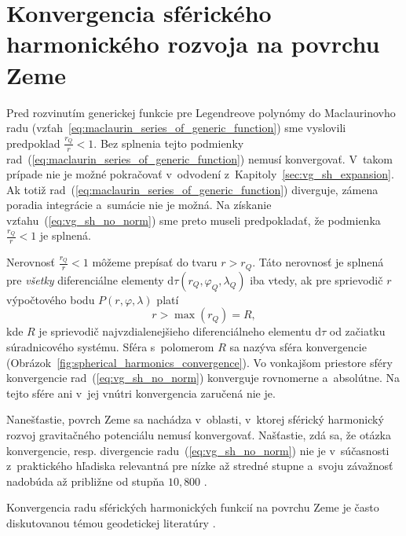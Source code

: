 \documentclass[a4paper,12pt]{book}
\newcommand{\diff}{\mathrm d}
\begin{document}

\section{Konvergencia sférického harmonického rozvoja na povrchu Zeme}
\label{sec:convergence_of_spherical_harmonics}

Pred rozvinutím generickej funkcie pre Legendreove polynómy do Maclaurinovho 
radu (vzťah~\ref{eq:maclaurin_series_of_generic_function}) sme vyslovili 
predpoklad $\frac{r_Q}{r} < 1$.  Bez splnenia tejto podmienky 
rad~(\ref{eq:maclaurin_series_of_generic_function}) nemusí konvergovať.  
V~takom prípade nie je možné pokračovať v~odvodení 
z~Kapitoly~\ref{sec:vg_sh_expansion}.  Ak totiž 
rad~(\ref{eq:maclaurin_series_of_generic_function}) diverguje, zámena poradia 
integrácie a~sumácie nie je možná.  Na získanie vzťahu~(\ref{eq:vg_sh_no_norm}) 
sme preto museli predpokladať, že podmienka $\frac{r_Q}{r} < 1$ je splnená.

Nerovnosť $\frac{r_Q}{r} < 1$ môžeme prepísať do tvaru $r > r_Q$.  Táto
nerovnosť je splnená pre \emph{všetky} diferenciálne elementy $\diff \tau(r_Q,
\varphi_Q, \lambda_Q)$ iba vtedy, ak pre sprievodič $r$ výpočtového bodu $P(r,
\varphi, \lambda)$ platí
%
\begin{equation}
r > \max(r_Q) = R{,}
\end{equation}
%
kde $R$ je sprievodič najvzdialenejšieho diferenciálneho elementu $\diff\tau$ 
od začiatku súradnicového systému.  Sféra s~polomerom $R$ sa nazýva sféra 
konvergencie \parencite{Hotine} 
(Obrázok~\ref{fig:spherical_harmonics_convergence}).  Vo vonkajšom priestore 
sféry konvergencie rad~(\ref{eq:vg_sh_no_norm}) konverguje rovnomerne 
a~absolútne.  Na tejto sfére ani v~jej vnútri konvergencia zaručená nie je.

Nanešťastie, povrch Zeme sa nachádza v~oblasti, v~ktorej sférický harmonický 
rozvoj gravitačného potenciálu nemusí konvergovať.  Našťastie, zdá sa, že 
otázka konvergencie, resp. divergencie radu~(\ref{eq:vg_sh_no_norm}) nie je 
v~súčasnosti z~praktického hľadiska relevantná pre nízke až stredné stupne 
a~svoju závažnosť nadobúda až približne od stupňa $10{,}800$ 
\parencite{Hirt2016,Rexer2017}.

Konvergencia radu sférických harmonických funkcií na povrchu Zeme je často 
diskutovanou témou geodetickej literatúry 
\parencite{Hotine,Krarup1969,MoritzAdvancedGeodesy,Sjoberg1980,Jekeli1983,SansoGeoidDetermination}.
\end{document}
